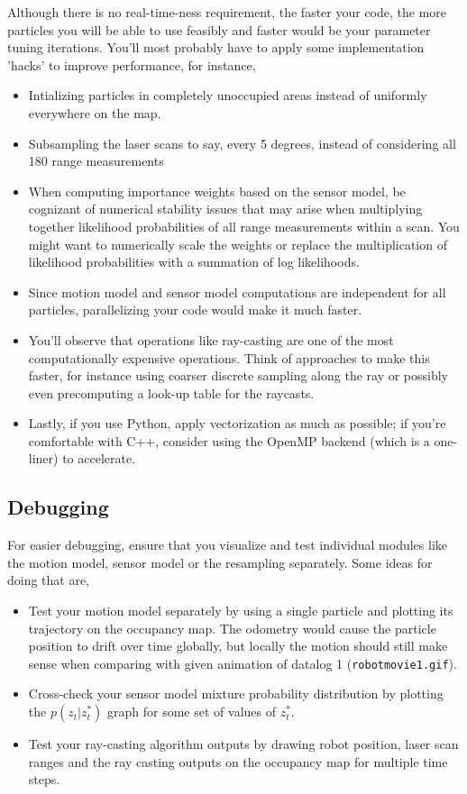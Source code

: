 \documentclass[12pt, a4paper]{article}
\begin{document}
Although there is no real-time-ness requirement, the faster your code,
the more particles you will be able to use feasibly and faster would
be your parameter tuning iterations. You'll most probably have to
apply some implementation 'hacks' to improve performance, for instance,
\begin{itemize}
\item Intializing particles in completely unoccupied areas instead of uniformly
everywhere on the map.
\item Subsampling the laser scans to say, every 5 degrees, instead of considering
all 180 range measurements
\item When computing importance weights based on the sensor model, be cognizant
of numerical stability issues that may arise when multiplying together
likelihood probabilities of all range measurements within a scan.
You might want to numerically scale the weights or replace the multiplication
of likelihood probabilities with a summation of log likelihoods.
\item Since motion model and sensor model computations are independent for
all particles, parallelizing your code would make it much faster.
\item You'll observe that operations like ray-casting are one of the most
computationally expensive operations. Think of approaches to make
this faster, for instance using coarser discrete sampling along the
ray or possibly even precomputing a look-up table for the raycasts.
\item Lastly, if you use Python, apply vectorization as much as possible; if you're comfortable with C++, consider using the OpenMP backend (which is a one-liner) to accelerate.
\end{itemize}

\subsection*{Debugging}

For easier debugging, ensure that you visualize and test individual
modules like the motion model, sensor model or the resampling separately.
Some ideas for doing that are,
\begin{itemize}
\item Test your motion model separately by using a single particle and plotting
its trajectory on the occupancy map. The odometry would cause the
particle position to drift over time globally, but locally the motion
should still make sense when comparing with given animation of datalog
1 (\texttt{robotmovie1.gif}).
\item Cross-check your sensor model mixture probability distribution by
plotting the $p(z_t|z^*_t)$ graph for some set of values of $z^*_t$. 
\item Test your ray-casting algorithm outputs by drawing robot position,
laser scan ranges and the ray casting outputs on the occupancy map
for multiple time steps.
\end{itemize}
\end{document}
